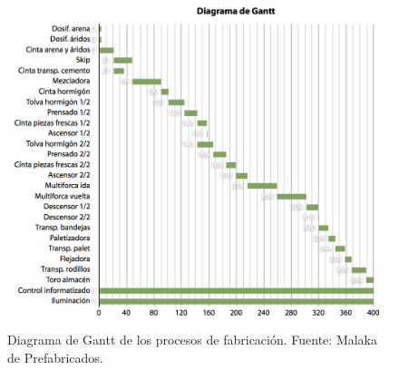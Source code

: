 \begin{figure}[!htb]
\centering
\includegraphics[width=15cm]{img/gantt.png}
\caption[Diagrama de Gantt de los procesos de fabricación.]{Diagrama de Gantt de los procesos de fabricación. Fuente: Malaka de Prefabricados.}
\label{fig:gant}
\end{figure}
